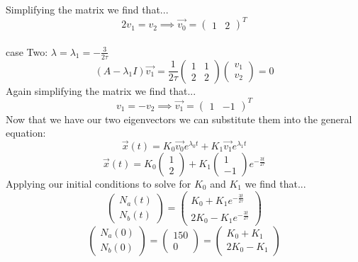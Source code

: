 \documentclass[twocolumn]{article}
\begin{document}
Simplifying the matrix we find that...
	\begin{equation}
	2v_1=v_2 \implies \vec{v_0}=\left(\begin{array}{cc} 1 & 2\end{array}\right)^{T}
	\end{equation}
\\case Two: $\lambda = \lambda_1 = -\frac{3}{2\tau}$
	\begin{equation}
	\left(A-\lambda_1 I\right)\vec{v_1}=\frac{1}{2\tau}\left(\begin{array}{cc} 1 & 1\\ 2 & 2\end{array}	\right)\left(\begin{array}{c} v_1\\ v_2 \end{array}\right)=0
	\end{equation}
Again simplifying the matrix we find that...
	\begin{equation}
	v_1=-v_2 \implies \vec{v_1}=\left(\begin{array}{cc} 1 & -1\end{array}\right)^{T}
	\end{equation}
Now that we have our two eigenvectors we can substitute them into the general equation:
	\begin{equation}
	\vec{x}(t)=K_0\vec{v_0}e^{\lambda_0 t} + K_1\vec{v_1}e^{\lambda_1 t}
	\end{equation}
	\begin{equation}
	\vec{x}(t)=K_0\left(\begin{array}{c} 1\\ 2\end{array}\right)+K_1\left(\begin{array}{c} 1\\ -1\end{array}\right)e^{-\frac{3t}{2\tau}}
	\end{equation}
Applying our initial conditions to solve for $K_0$ and $K_1$ we find that...
	\begin{equation}
	\left(\begin{array}{c} N_a(t)\\ N_b(t)\end{array}\right) = \left(\begin{array}{c} K_0+K_1e^{-\frac{3t}{2\tau}}\\ 2K_0-K_1e^{-\frac{3t}{2\tau}}\end{array}\right)
	\end{equation}	
	\begin{equation}
	\left(\begin{array}{c} N_a(0)\\ N_b(0)\end{array}\right)=\left(\begin{array}{c} 150\\ 0\end{array}\right) = \left(\begin{array}{c} K_0+K_1\\ 2K_0-K_1\end{array}\right)
	\end{equation}
\end{document}
